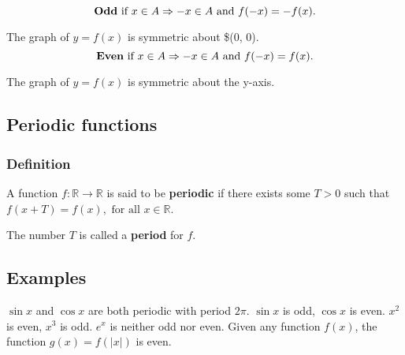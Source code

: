 \documentclass[11pt]{article}
\begin{document}
\[\text{\textbf{Odd} if } x \in A \Rightarrow -x \in A \text{ and } f(-x) = -f(x).\]

The graph of \(y = f(x)\) is symmetric about \$(0, 0).
\\[0pt]

\[\text{\textbf{Even} if } x \in A \Rightarrow -x \in A \text{ and } f(-x) = f(x).\]

The graph of \(y = f(x)\) is symmetric about the y-axis.


\subsection{Periodic functions}
\label{sec:org213b5f0}

\subsubsection{Definition}
\label{sec:org3dc0143}
A function \(f : \mathbb{R} \rightarrow \mathbb{R}\) is said to be \textbf{periodic} if there exists some \(T > 0\) such that \(f(x + T) = f(x), \text{ for all } x \in \mathbb{R}\).

The number \(T\) is called a \textbf{period} for \(f\).

\subsection{Examples}
\label{sec:orgb2d699c}
\(\sin x\) and \(\cos x\) are both periodic with period \(2\pi\).
\(\sin x\) is odd, \(\cos x\) is even.
\(x^2\) is even, \(x^3\) is odd.
\(e^x\) is neither odd nor even.
Given any function \(f(x)\), the function \(g(x) = f(|x|)\) is even.
\end{document}
